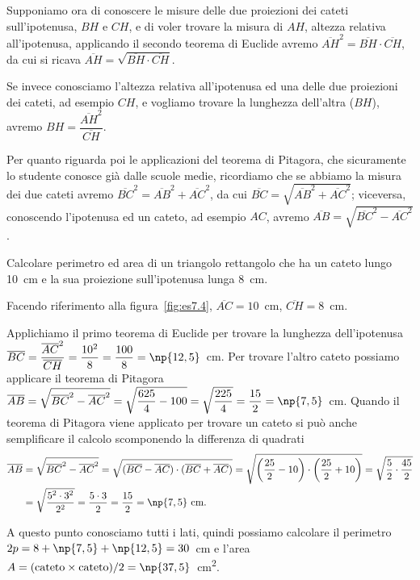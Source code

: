 Supponiamo ora di conoscere le misure delle due proiezioni dei cateti 
sull'ipotenusa, \(BH\) e \(CH\), e di voler trovare la misura di \(AH\), 
altezza relativa all'ipotenusa, applicando il secondo teorema di 
Euclide avremo \(\overline{AH}^2=\overline{BH}\cdot \overline{CH}\), da 
cui si ricava \(\overline{AH}=\sqrt{\overline{BH}\cdot\overline{CH}}\).

Se invece conosciamo l'altezza relativa all'ipotenusa ed una delle 
due proiezioni dei cateti, ad esempio \(CH\), e vogliamo trovare la 
lunghezza dell'altra (\(BH\)), avremo 
\(BH=\dfrac{\overline{AH}^2}{\overline{CH}}\).

Per quanto riguarda poi le applicazioni del teorema di Pitagora, che 
sicuramente lo studente conosce già dalle scuole medie, ricordiamo 
che se abbiamo la misura dei due cateti avremo 
\(\overline{BC}^2=\overline{AB}^2+\overline{AC}^2\), da cui 
\(\overline{BC}=\sqrt{\overline{AB}^2+\overline{AC}^2}\); viceversa, 
conoscendo l'ipotenusa ed un cateto, ad esempio \(AC\), avremo 
\(\overline{AB}=\sqrt{\overline{BC}^2-\overline{AC}^2}\).

\begin{esempio}\label{es:7.4}
Calcolare perimetro ed area di un triangolo rettangolo che ha un 
cateto lungo 10~cm e la sua proiezione sull'ipotenusa lunga 
8~cm.\vspace{7pt}

Facendo riferimento alla figura~\ref{fig:es7.4}, 
\(\overline{AC}=10\)~cm, \(\overline{CH}=8\)~cm.

Applichiamo il primo teorema di Euclide per trovare la lunghezza 
dell'ipotenusa 
\(\overline{BC}=\dfrac{\overline{AC}^2}{\overline{CH}}=\dfrac{10^2}{8}
=\dfrac{100}{8}=\np{12,5}\)~cm. Per trovare l'altro cateto possiamo 
applicare il teorema di Pitagora 
\(\overline{AB}=\sqrt{\overline{BC}^2-\overline{AC}^2}=\sqrt{\dfrac{625
}{4}-100}=\sqrt{\dfrac{225}{4}}=\dfrac{15}{2}=\np{7,5}\)~cm.
Quando il teorema di Pitagora viene applicato per trovare un cateto 
si può anche semplificare il calcolo scomponendo la differenza di 
quadrati
\begin{align*}
\overline{AB}&=\sqrt{\overline{BC}^2-\overline{AC}^2}=\sqrt{(\overline
{BC}-\overline{AC})\cdot(\overline{BC}+\overline{AC})}=\sqrt{
\left(\dfrac{25}{2}-10\right)\cdot\left(\dfrac{25}{2}+10\right)}=\sqrt
{\dfrac{5}{2}\cdot\dfrac{45}{2}}\\
&=\sqrt{\dfrac{5^2\cdot 3^2}{2^2}}=\dfrac{5\cdot 
3}{2}=\dfrac{15}{2}=\np{7,5}\text{~cm.}
\end{align*}

A questo punto conosciamo tutti i lati, quindi possiamo calcolare il 
perimetro \(2p=8+\np{7,5}+\np{12,5}=30\)~cm e l'area 
\(A=(\text{cateto}\times\text{cateto})/2 = 
\np{37,5}\)~cm\textsuperscript{2}.
\end{esempio}


